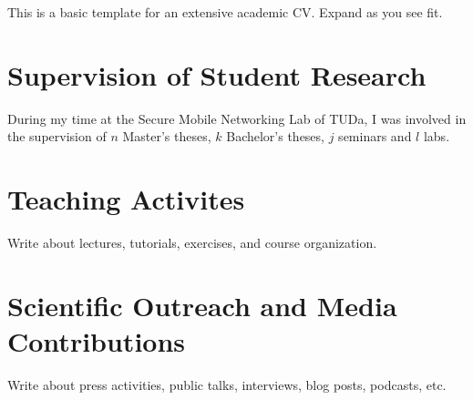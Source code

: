 
\label{ch:Teaching}

This is a basic template for an extensive academic CV. Expand as you see fit.

\section*{Supervision of Student Research}
During my time at the Secure Mobile Networking Lab of TUDa, I was involved in the supervision of $n$ Master's theses, $k$ Bachelor's theses, $j$ seminars and $l$ labs.
\begin{refsection}[supervision]


\nocite{*} %
\printbibliography[
  heading=none,
  keyword=supervisedthesis
]
\end{refsection}


\section*{Teaching Activites}

Write about lectures, tutorials, exercises, and course organization.


\section*{Scientific Outreach and Media Contributions}

Write about press activities, public talks, interviews, blog posts, podcasts, etc.
